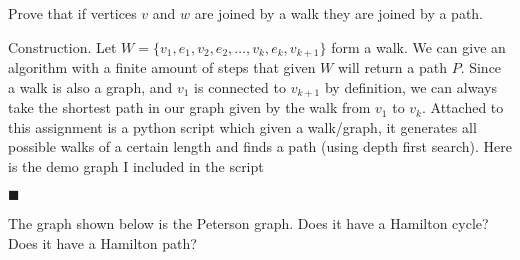 \documentclass[12pt]{article}
\renewcommand{\qed}{\hfill$\blacksquare$}
\renewenvironment{proof}{\vspace{1em}\begin{addmargin}[2em]{0em}\begin{newproof}}{\end{newproof}\end{addmargin}\qed}
\newenvironment{exercise}[2][Exercise]{\begin{trivlist}
\item[\hskip \labelsep {\bfseries #1} \hskip \labelsep {\bfseries #2.}]}{\end{trivlist}}
\begin{document}
\begin{exercise} {5.2.3 (2pt)}
	Prove that if vertices $v$ and $w$ are joined by a walk they are joined by a path.
\end{exercise}
\begin{proof}
	Construction. Let $W = \{v_1,e_1,v_2,e_2,\ldots,v_k,e_k,v_{k+1}\}$ form a walk. We can give an algorithm with a finite amount of steps that given $W$ will return a path $P$. Since a walk is also a graph, and $v_1$ is connected to $v_{k+1}$ by definition, we can always take the shortest path in our graph given by the walk from $v_1$ to $v_k$. Attached to this assignment is a python script which given a walk/graph, it generates all possible walks of a certain length and finds a path (using depth first search). Here is the demo graph I included in the script
\end{proof}
\begin{center}
\end{center}

\begin{exercise} {5.3.3 (2pt)}
	The graph shown below is the Peterson graph. Does it have a Hamilton cycle? Does it have a Hamilton path?
\end{exercise}
\begin{center}	

\end{center}
\end{document}
